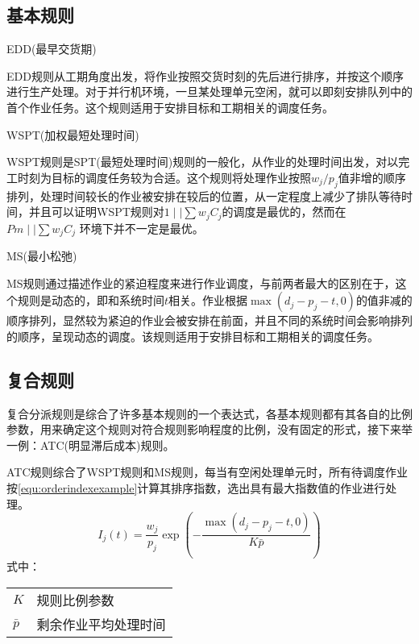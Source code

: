 \subsection{基本规则}
\begin{asparaenum}
\item EDD(最早交货期)

EDD规则从工期角度出发，将作业按照交货时刻的先后进行排序，并按这个顺序进行生产处理。对于并行机环境，一旦某处理单元空闲，就可以即刻安排队列中的首个作业任务。这个规则适用于安排目标和工期相关的调度任务。
\item WSPT(加权最短处理时间)

WSPT规则是SPT(最短处理时间)规则的一般化，从作业的处理时间出发，对以完工时刻为目标的调度任务较为合适。这个规则将处理作业按照$w_j/p_j$值非增的顺序排列，处理时间较长的作业被安排在较后的位置，从一定程度上减少了排队等待时间，并且可以证明WSPT规则对$1\mid \mid \sum w_jC_j$的调度是最优的\cite{pinedo}，然而在$Pm \mid \mid \sum w_jC_j$ 环境下并不一定是最优。

\item MS(最小松弛)
\end{asparaenum}

MS规则通过描述作业的紧迫程度来进行作业调度，与前两者最大的区别在于，这个规则是动态的，即和系统时间$t$相关。作业根据$\max (d_j - p_j - t , 0)$的值非减的顺序排列，显然较为紧迫的作业会被安排在前面，并且不同的系统时间会影响排列的顺序，呈现动态的调度。该规则适用于安排目标和工期相关的调度任务。
\subsection{复合规则}
复合分派规则是综合了许多基本规则的一个表达式，各基本规则都有其各自的比例参数，用来确定这个规则对符合规则影响程度的比例，没有固定的形式，接下来举一例：ATC(明显滞后成本)规则。

ATC规则综合了WSPT规则和MS规则，每当有空闲处理单元时，所有待调度作业按\eqref{equ:orderindexexample}计算其排序指数，选出具有最大指数值的作业进行处理。
\begin{equation}
I_j(t) = \frac{w_j}{p_j}\exp\left(-\frac{\max(d_j - p_j - t, 0)}{K\bar p}\right) \label{equ:orderindexexample}
\end{equation}
式中：

\begin{tabular}{ll}
$K$ & 规则比例参数\\
$\bar p$ &剩余作业平均处理时间
\end{tabular}

